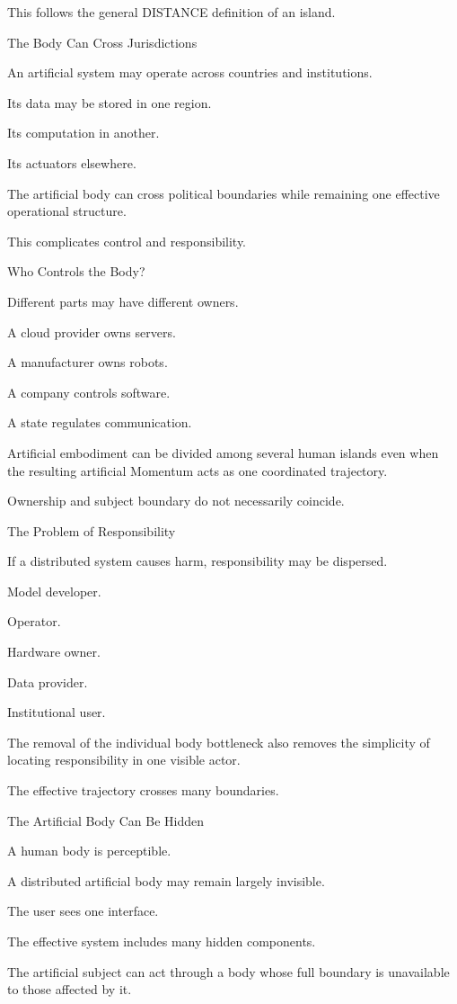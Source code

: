 This follows the general DISTANCE definition of an island.

The Body Can Cross Jurisdictions

An artificial system may operate across countries and institutions.

Its data may be stored in one region.

Its computation in another.

Its actuators elsewhere.

The artificial body can cross political boundaries while remaining one effective operational structure.

This complicates control and responsibility.

Who Controls the Body?

Different parts may have different owners.

A cloud provider owns servers.

A manufacturer owns robots.

A company controls software.

A state regulates communication.

Artificial embodiment can be divided among several human islands even when the resulting artificial Momentum acts as one coordinated trajectory.

Ownership and subject boundary do not necessarily coincide.

The Problem of Responsibility

If a distributed system causes harm, responsibility may be dispersed.

Model developer.

Operator.

Hardware owner.

Data provider.

Institutional user.

The removal of the individual body bottleneck also removes the simplicity of locating responsibility in one visible actor.

The effective trajectory crosses many boundaries.

The Artificial Body Can Be Hidden

A human body is perceptible.

A distributed artificial body may remain largely invisible.

The user sees one interface.

The effective system includes many hidden components.

The artificial subject can act through a body whose full boundary is unavailable to those affected by it.

